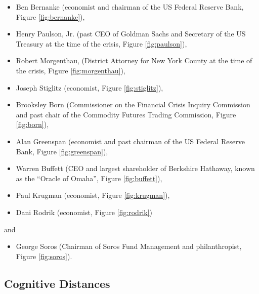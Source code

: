 \documentclass[11pt]{article}
\begin{document}
\begin{itemize}
\item Ben Bernanke (economist and chairman of the US Federal Reserve Bank, Figure \ref{fig:bernanke}),
\item Henry Paulson, Jr. (past CEO of Goldman Sachs and Secretary of the US Treasury at the time of the crisis, Figure \ref{fig:paulson}),
\item Robert Morgenthau, (District Attorney for New York County at the time of the crisis, Figure \ref{fig:morgenthau}),
\item Joseph Stiglitz (economist, Figure \ref{fig:stiglitz}),
\item Brooksley Born (Commissioner on the Financial Crisis Inquiry Commission and past chair of the Commodity Futures Trading Commission, Figure \ref{fig:born}),
\item Alan Greenspan (economist and past chairman of the US Federal Reserve Bank, Figure \ref{fig:greenspan}),
\item Warren Buffett (CEO and largest shareholder of Berkshire Hathaway, known as the ``Oracle of Omaha'', Figure \ref{fig:buffett}),
\item Paul Krugman (economist, Figure \ref{fig:krugman}),
\item Dani Rodrik (economist, Figure \ref{fig:rodrik})
\end{itemize}
and
\begin{itemize}
\item George Soros (Chairman of Soros Fund Management and philanthropist, Figure \ref{fig:soros}).
\end{itemize}
\subsection{Cognitive Distances}
\label{sec-4-2}
\end{document}
